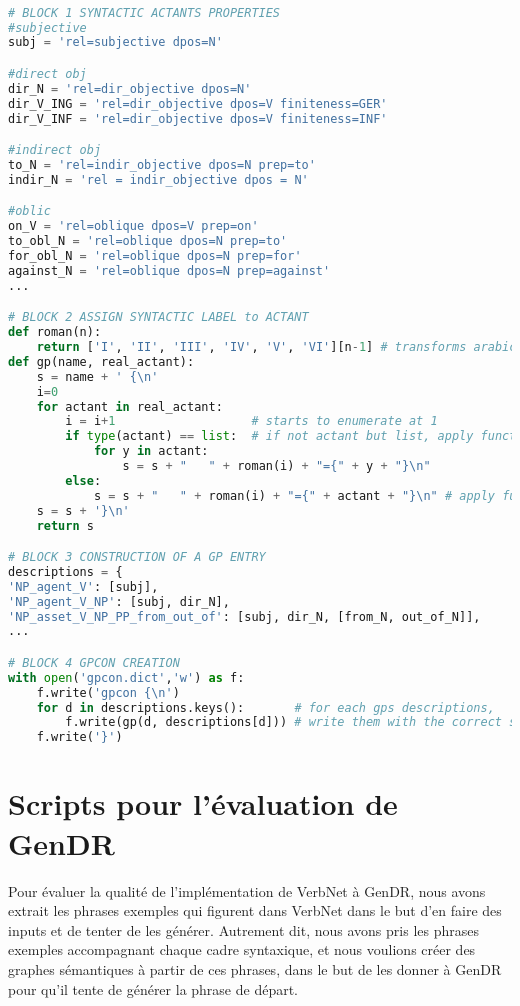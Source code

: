 \begin{lstlisting}[language=Python, caption = Création du dictionnaire de patrons de régime]

# BLOCK 1 SYNTACTIC ACTANTS PROPERTIES
#subjective
subj = 'rel=subjective dpos=N'

#direct obj
dir_N = 'rel=dir_objective dpos=N'
dir_V_ING = 'rel=dir_objective dpos=V finiteness=GER'
dir_V_INF = 'rel=dir_objective dpos=V finiteness=INF'

#indirect obj
to_N = 'rel=indir_objective dpos=N prep=to'
indir_N = 'rel = indir_objective dpos = N'

#oblic
on_V = 'rel=oblique dpos=V prep=on'
to_obl_N = 'rel=oblique dpos=N prep=to' 
for_obl_N = 'rel=oblique dpos=N prep=for'
against_N = 'rel=oblique dpos=N prep=against'
...

# BLOCK 2 ASSIGN SYNTACTIC LABEL to ACTANT
def roman(n):
    return ['I', 'II', 'III', 'IV', 'V', 'VI'][n-1] # transforms arabic numbers in roman numbers
def gp(name, real_actant):
    s = name + ' {\n'
    i=0
    for actant in real_actant:
        i = i+1                   # starts to enumerate at 1
        if type(actant) == list:  # if not actant but list, apply function to actants in list
            for y in actant:
                s = s + "   " + roman(i) + "={" + y + "}\n"
        else:
            s = s + "   " + roman(i) + "={" + actant + "}\n" # apply function to actant
    s = s + '}\n'
    return s 

# BLOCK 3 CONSTRUCTION OF A GP ENTRY
descriptions = {
'NP_agent_V': [subj],
'NP_agent_V_NP': [subj, dir_N],
'NP_asset_V_NP_PP_from_out_of': [subj, dir_N, [from_N, out_of_N]],
...

# BLOCK 4 GPCON CREATION
with open('gpcon.dict','w') as f: 
    f.write('gpcon {\n')
    for d in descriptions.keys():       # for each gps descriptions,
        f.write(gp(d, descriptions[d])) # write them with the correct syntactic label
    f.write('}')
\end{lstlisting}

\section{Scripts pour l'évaluation de GenDR}

Pour évaluer la qualité de l'implémentation de VerbNet à GenDR, nous avons extrait les phrases exemples qui figurent dans VerbNet dans le but d'en faire des inputs et de tenter de les générer. Autrement dit, nous avons pris les phrases exemples accompagnant chaque cadre syntaxique, et nous voulions créer des graphes sémantiques à partir de ces phrases, dans le but de les donner à GenDR pour qu'il tente de générer la phrase de départ.

